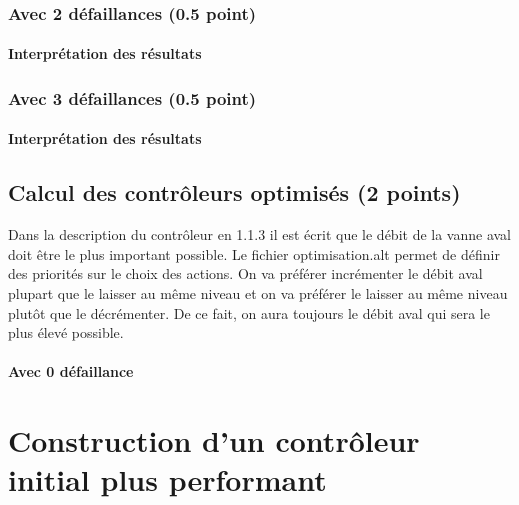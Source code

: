 \documentclass[a4paper]{book}
\begin{document}
\subsubsection{Avec 2 défaillances (0.5 point)}





\paragraph{Interprétation des résultats}

\subsubsection{Avec 3 défaillances (0.5 point)}




%
\paragraph{Interprétation des résultats}

\subsection{Calcul des contrôleurs optimisés (2 points)}

Dans la description du contrôleur en 1.1.3 il est écrit que le débit de la vanne aval doit être le plus important possible.
Le fichier optimisation.alt permet de définir des priorités sur le choix des actions. On va préférer incrémenter le débit aval plupart que le laisser au même niveau et on va préférer le laisser au même niveau plutôt que le décrémenter. De ce fait, on aura toujours le débit aval qui sera le plus élevé possible.
\paragraph{Avec 0 défaillance}


\section{Construction d'un contrôleur initial plus performant}
\end{document}
